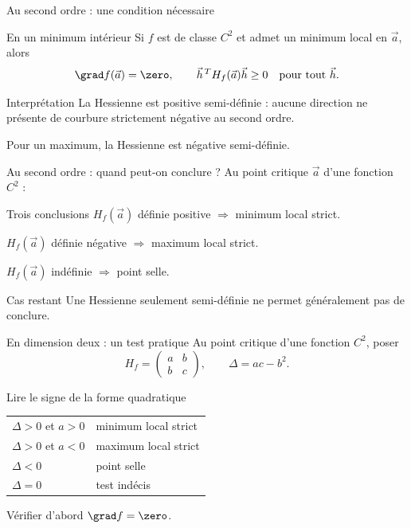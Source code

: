 \begin{frame}[t]{Au second ordre : une condition nécessaire}
\coursanalyse
\begin{theoreme}{En un minimum intérieur}
Si $f$ est de classe $C^2$ et admet un minimum local en $\vec a$, alors
\[\grad f(\vec a)=\zero,\qquad \vec h^{\,T}H_f(\vec a)\vec h\ge0\quad\text{pour tout }\vec h.\]
\end{theoreme}
\begin{cours}{Interprétation}
La Hessienne est positive semi-définie : aucune direction ne présente de courbure strictement négative au second ordre.
\end{cours}\vfill Pour un maximum, la Hessienne est négative semi-définie.
\end{frame}

\begin{frame}[t]{Au second ordre : quand peut-on conclure ?}
\coursanalyse
Au point critique $\vec a$ d’une fonction $C^2$ :
\begin{theoreme}{Trois conclusions}
$H_f(\vec a)$ définie positive $\Longrightarrow$ minimum local strict.
\medskip\par $H_f(\vec a)$ définie négative $\Longrightarrow$ maximum local strict.
\medskip\par $H_f(\vec a)$ indéfinie $\Longrightarrow$ point selle.
\end{theoreme}
\vfill\begin{resultat}{Cas restant}
Une Hessienne seulement semi-définie ne permet généralement pas de conclure.
\end{resultat}
\end{frame}

\begin{frame}[t]{En dimension deux : un test pratique}
\coursanalyse
Au point critique d’une fonction $C^2$, poser
\[H_f=\begin{pmatrix}a&b\\b&c\end{pmatrix},\qquad \Delta=ac-b^2.\]
\begin{cours}{Lire le signe de la forme quadratique}
\begin{tabular}{@{}ll@{}}
$\Delta>0$ et $a>0$ & minimum local strict\\[2mm]
$\Delta>0$ et $a<0$ & maximum local strict\\[2mm]
$\Delta<0$ & point selle\\[2mm]
$\Delta=0$ & test indécis
\end{tabular}
\end{cours}\vfill Vérifier d’abord $\grad f=\zero$.
\end{frame}


